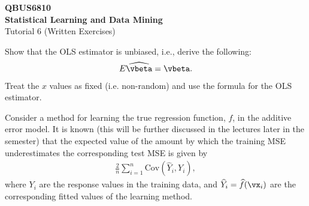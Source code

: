 \documentclass[12pt, answers]{exam}
\def\eps{\varepsilon}
\def\var{\text{Var}}
\def\cov{\text{Cov}}
\begin{document}
\begin{center}
{\Large \textbf{QBUS6810} \\\textbf{Statistical Learning and Data Mining}}\\ \bigskip \large{Tutorial 6 (Written Exercises)}
\end{center}




\begin{questions}


\question


Show that the OLS estimator is unbiased, i.e., derive the following:
\begin{align*}
E\widehat{\vbeta}=\vbeta.
\end{align*}
Treat the $x$ values as fixed (i.e. non-random) and use the formula for the OLS estimator.\vspace{12pt}

\question


Consider a method for learning the true regression function, $f$, in the additive error model.  It is known (this will be further discussed in the lectures later in the semester) that the expected value of the amount by which the training MSE underestimates the corresponding test MSE is given by
\begin{align}
\label{eq1}
\frac{2}{n}\sum_{i=1}^{n}\cov(\widehat{Y}_i,Y_i),
\end{align}
where $Y_i$ are the response values in the training data, and $\widehat{Y}_i=\widehat{f}(\vx_i)$ are the corresponding fitted values of the learning method.

\medskip



\end{questions}
\end{document}
